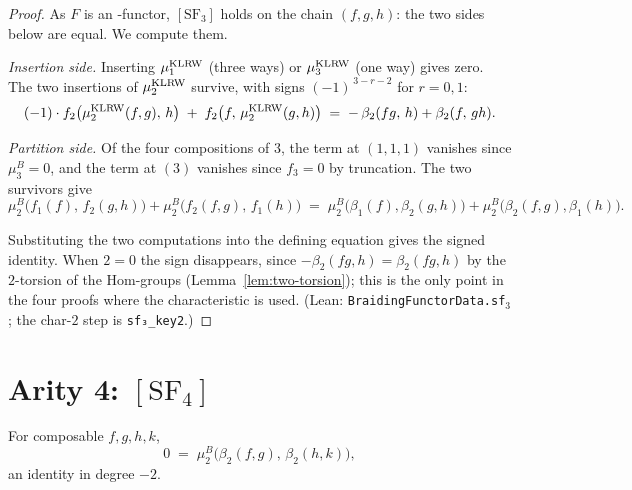 \begin{proof}
  As $F$ is an \Ainf-functor, $[\mathrm{SF}_3]$ holds on the chain
  $(f,g,h)$: the two sides below are equal. We compute them.

  \emph{Insertion side.} Inserting $\mu^{\operatorname{KLRW}}_1$ (three ways) or
  $\mu^{\operatorname{KLRW}}_3$ (one way) gives zero. The two insertions of
  $\mu^{\operatorname{KLRW}}_2$ survive, with signs $(-1)^{\,3-r-2}$ for $r = 0, 1$:
  \[
    (-1)\cdot f_2\big(\mu^{\operatorname{KLRW}}_2(f,g),\, h\big)
      \;+\; f_2\big(f,\, \mu^{\operatorname{KLRW}}_2(g,h)\big)
    \;=\; -\,\beta_2(fg,\, h) + \beta_2(f,\, gh).
  \]

  \emph{Partition side.} Of the four compositions of $3$, the term at
  $(1,1,1)$ vanishes since $\mu^B_3 = 0$, and the term at $(3)$ vanishes
  since $f_3 = 0$ by truncation. The two survivors give
  \[
    \mu^B_2\big(f_1(f),\, f_2(g,h)\big)
      + \mu^B_2\big(f_2(f,g),\, f_1(h)\big)
    \;=\; \mu^B_2\big(\beta_1(f), \beta_2(g,h)\big)
      + \mu^B_2\big(\beta_2(f,g), \beta_1(h)\big).
  \]

  Substituting the two computations into the defining equation gives the
  signed identity. When $2 = 0$ the sign
  disappears, since $-\beta_2(fg, h) = \beta_2(fg, h)$ by the $2$-torsion of
  the Hom-groups (Lemma~\ref{lem:two-torsion}); this is the only point in the
  four proofs where the characteristic is used. (Lean:
  \texttt{BraidingFunctorData.sf}$_3$; the char-$2$ step is
  \texttt{sf₃\_key2}.)
\end{proof}

\section{Arity 4: \texorpdfstring{$[\mathrm{SF}_4]$}{[SF4]}}

\begin{theorem}\label{thm:sf4}
  For composable $f, g, h, k$,
  \[
    0 \;=\; \mu^B_2\big(\beta_2(f,g),\, \beta_2(h,k)\big),
  \]
  an identity in degree $-2$.
\end{theorem}

